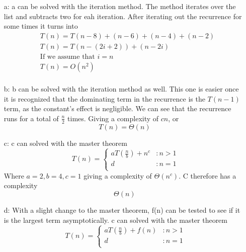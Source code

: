 \documentclass[12pt]{article}
\begin{document}
    \begin{itemize}
      \item[a:] a can be solved with the iteration method. The method iterates over the list and subtracts two for eah iteration. After iterating out the recurrence for some times it turns into
        \begin{equation}
          \begin{aligned}
            & T(n) = T(n-8) + (n-6) + (n-4) + (n-2) \\
            & T(n) = T(n-(2i+2)) + (n - 2i) \\
            & \text{If we assume that $i = n$} \\
            & T(n) = O(n^2) \\
          \end{aligned}
        \end{equation}


      \item[b:] b can be solved with the iteration method as well. This one is easier once it is recognized that the dominating term in the recurrence is the $T(n-1)$ term, as the constant's effect is negligible. We can see that the recurrence runs for a total of $\frac{n}{2}$ times. Giving a complexity of $cn$, or 
        $$T(n) = \Theta(n)$$

      \item[c:] c can solved with the master theorem 
        \begin{displaymath} \
          T(n) = \left\{
          \begin{array}{ll}
            aT(\frac{n}{b}) + n^c & : n > 1 \\
            d & : n = 1 \\
          \end{array}
          \right.
        \end{displaymath}
        Where $a = 2, b = 4, c = 1$ giving a complexity of $\Theta(n^c)$. C therefore has a complexity $$\Theta(n)$$
      \item[d:] With a slight change to the master theorem, f(n) can be tested to see if it is the largest term asymptotically.   c can solved with the master theorem 
        \begin{displaymath} \
          T(n) = \left\{
          \begin{array}{ll}
            aT(\frac{n}{b}) + f(n) & : n > 1 \\
            d & : n = 1 \\
          \end{array}
          \right.
        \end{displaymath}


\end{itemize}
\end{document}
